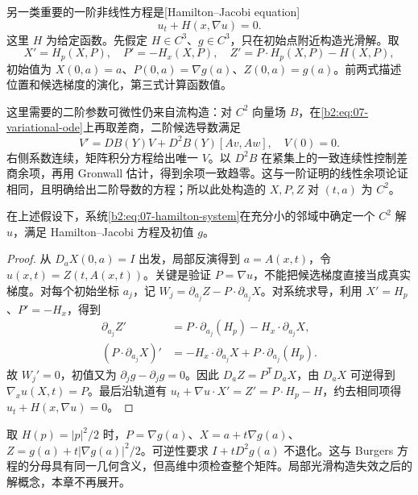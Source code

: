 另一类重要的一阶非线性方程是[Hamilton--Jacobi equation]
\[
 u_t+H(x,\nabla u)=0.
\]
这里 \(H\) 为给定函数。先假定 \(H\in C^3\)、\(g\in C^3\)，只在初始点附近构造光滑解。取
\begin{equation}\label{b2:eq:07-hamilton-system}
 X'=H_p(X,P),\quad P'=-H_x(X,P),\quad
 Z'=P\cdot H_p(X,P)-H(X,P),
\end{equation}
初始值为 \(X(0,a)=a\)、\(P(0,a)=\nabla g(a)\)、\(Z(0,a)=g(a)\)。前两式描述位置和候选梯度的演化，第三式计算函数值。

\ProseParagraphBreak

这里需要的二阶参数可微性仍来自流构造：对 \(C^2\) 向量场 \(B\)，在\eqref{b2:eq:07-variational-ode}上再取差商，二阶候选导数满足
\[
 V'=DB(Y)V+D^2B(Y)[A v,A w],\quad V(0)=0.
\]
右侧系数连续，矩阵积分方程给出唯一 \(V\)。以 \(D^2B\) 在紧集上的一致连续性控制差商余项，再用 Gronwall 估计，得到余项一致趋零。这与一阶证明的线性余项论证相同，且明确给出二阶导数的方程；所以此处构造的 \(X,P,Z\) 对 \((t,a)\) 为 \(C^2\)。

\begin{proposition}\label{b2:prop:07-hamilton-local}
在上述假设下，系统\eqref{b2:eq:07-hamilton-system}在充分小的邻域中确定一个 \(C^2\) 解 \(u\)，满足 Hamilton--Jacobi 方程及初值 \(g\)。
\end{proposition}
\begin{proof}
从 \(D_aX(0,a)=I\) 出发，局部反演得到 \(a=A(x,t)\)，令 \(u(x,t)=Z(t,A(x,t))\)。关键是验证 \(P=\nabla u\)，不能把候选梯度直接当成真实梯度。对每个初始坐标 \(a_j\)，记
\(W_j=\partial_{a_j}Z-P\cdot\partial_{a_j}X\)。对系统求导，利用 \(X'=H_p\)、\(P'=-H_x\)，得到
\[
 \begin{aligned}
 \partial_{a_j}Z'
 &=P\cdot\partial_{a_j}(H_p)-H_x\cdot\partial_{a_j}X,\\
 (P\cdot\partial_{a_j}X)'
 &=-H_x\cdot\partial_{a_j}X+P\cdot\partial_{a_j}(H_p).
 \end{aligned}
\]
故 \(W_j'=0\)，初值又为 \(\partial_jg-\partial_jg=0\)。因此 \(D_aZ=P^{\mathsf T}D_aX\)，由 \(D_aX\) 可逆得到 \(\nabla_xu(X,t)=P\)。最后沿轨道有
\(u_t+\nabla u\cdot X'=Z'=P\cdot H_p-H\)，约去相同项得 \(u_t+H(x,\nabla u)=0\)。
\end{proof}

取 \(H(p)=|p|^2/2\) 时，\(P=\nabla g(a)\)、\(X=a+t\nabla g(a)\)、\(Z=g(a)+t|\nabla g(a)|^2/2\)。可逆性要求 \(I+tD^2g(a)\) 不退化。这与 Burgers 方程的分母具有同一几何含义，但高维中须检查整个矩阵。局部光滑构造失效之后的解概念，本章不再展开。

